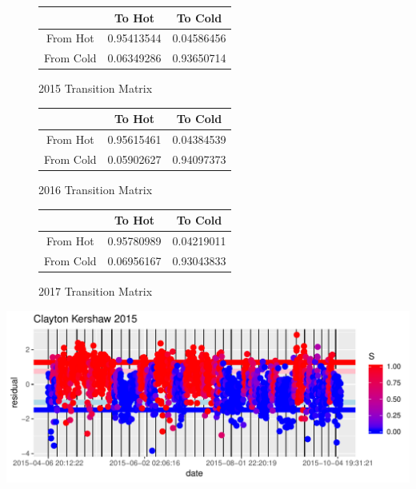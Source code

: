 \documentclass[letterpaper,12pt]{article}\usepackage[]{graphicx}\usepackage[]{color}
\makeatletter
\def\maxwidth{ %
  \ifdim\Gin@nat@width>\linewidth
    \linewidth
  \else
    \Gin@nat@width
  \fi
}
\newenvironment{knitrout}{}{} %
\makeatother
\begin{document}
\begin{figure}
\begin{center}
\begin{tabular}{ |c| c| c| }
\hline
 & To Hot  & To Cold \\ 
 \hline
From Hot & 0.95413544 & 0.04586456 \\  
\hline
From Cold & 0.06349286 & 0.93650714    \\
\hline
\end{tabular}
\end{center}
\caption{2015 Transition Matrix}
\end{figure}

\begin{figure}
\begin{center}
\begin{tabular}{ |c| c| c| }
\hline
 & To Hot  & To Cold \\ 
 \hline
From Hot &0.95615461 &  0.04384539  \\  
\hline
From Cold &0.05902627 &  0.94097373   \\
\hline
\end{tabular}
\end{center}
\caption{2016 Transition Matrix}
\end{figure}

\begin{figure}
\begin{center}
\begin{tabular}{ |c| c| c| }
\hline
 & To Hot  & To Cold \\ 
 \hline
From Hot &0.95780989 & 0.04219011  \\  
\hline
From Cold &0.06956167 & 0.93043833   \\
\hline
\end{tabular}
\end{center}
\caption{2017 Transition Matrix}
\end{figure}



\begin{knitrout}
\color{fgcolor}
\includegraphics[width=\maxwidth]{figure/unnamed-chunk-1-1} 

\end{knitrout}
\end{document}
